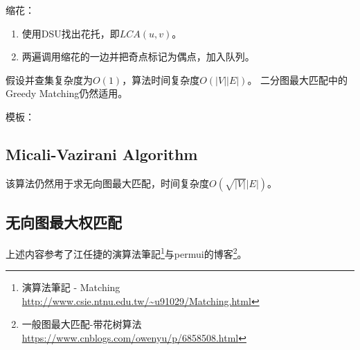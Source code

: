 缩花：
\begin{enumerate}
    \item 使用DSU找出花托，即$LCA(u,v)$。
    \item 两遍调用缩花的一边并把奇点标记为偶点，加入队列。
\end{enumerate}

假设并查集复杂度为$O(1)$，算法时间复杂度$O(|V||E|)$。
二分图最大匹配中的Greedy Matching仍然适用。

模板：


\subsection{Micali-Vazirani Algorithm}
该算法仍然用于求无向图最大匹配，时间复杂度$O(\sqrt{|V|}|E|)$。

\subsection{无向图最大权匹配}

上述内容参考了江任捷的演算法筆記\footnote{
    演算法筆記 - Matching
    \url{http://www.csie.ntnu.edu.tw/\~u91029/Matching.html}
}与permui的博客\footnote{
    一般图最大匹配-带花树算法
    \url{https://www.cnblogs.com/owenyu/p/6858508.html}
}。
